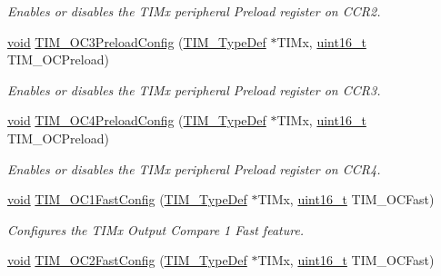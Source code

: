 \begin{DoxyCompactItemize}
\begin{DoxyCompactList}\small\item\em Enables or disables the T\+I\+Mx peripheral Preload register on C\+C\+R2. \end{DoxyCompactList}\item 
\hyperlink{usb__devapi_8h_afabf60e7f57651d6d595a02c75f07cd0}{void} \hyperlink{group___t_i_m___private___functions_ga8b2391685a519e60e596b7d596f86f09}{T\+I\+M\+\_\+\+O\+C3\+Preload\+Config} (\hyperlink{struct_t_i_m___type_def}{T\+I\+M\+\_\+\+Type\+Def} $\ast$T\+I\+Mx, \hyperlink{_p_e___types_8h_a1f1825b69244eb3ad2c7165ddc99c956}{uint16\+\_\+t} T\+I\+M\+\_\+\+O\+C\+Preload)
\begin{DoxyCompactList}\small\item\em Enables or disables the T\+I\+Mx peripheral Preload register on C\+C\+R3. \end{DoxyCompactList}\item 
\hyperlink{usb__devapi_8h_afabf60e7f57651d6d595a02c75f07cd0}{void} \hyperlink{group___t_i_m___private___functions_ga8bf4dfb35ff0c7b494dd96579f50b1ec}{T\+I\+M\+\_\+\+O\+C4\+Preload\+Config} (\hyperlink{struct_t_i_m___type_def}{T\+I\+M\+\_\+\+Type\+Def} $\ast$T\+I\+Mx, \hyperlink{_p_e___types_8h_a1f1825b69244eb3ad2c7165ddc99c956}{uint16\+\_\+t} T\+I\+M\+\_\+\+O\+C\+Preload)
\begin{DoxyCompactList}\small\item\em Enables or disables the T\+I\+Mx peripheral Preload register on C\+C\+R4. \end{DoxyCompactList}\item 
\hyperlink{usb__devapi_8h_afabf60e7f57651d6d595a02c75f07cd0}{void} \hyperlink{group___t_i_m___private___functions_gaec82031ca62f31f5483195c09752a83a}{T\+I\+M\+\_\+\+O\+C1\+Fast\+Config} (\hyperlink{struct_t_i_m___type_def}{T\+I\+M\+\_\+\+Type\+Def} $\ast$T\+I\+Mx, \hyperlink{_p_e___types_8h_a1f1825b69244eb3ad2c7165ddc99c956}{uint16\+\_\+t} T\+I\+M\+\_\+\+O\+C\+Fast)
\begin{DoxyCompactList}\small\item\em Configures the T\+I\+Mx Output Compare 1 Fast feature. \end{DoxyCompactList}\item 
\hyperlink{usb__devapi_8h_afabf60e7f57651d6d595a02c75f07cd0}{void} \hyperlink{group___t_i_m___private___functions_ga413359c87f46c69f1ffe2dc8fb3a65e7}{T\+I\+M\+\_\+\+O\+C2\+Fast\+Config} (\hyperlink{struct_t_i_m___type_def}{T\+I\+M\+\_\+\+Type\+Def} $\ast$T\+I\+Mx, \hyperlink{_p_e___types_8h_a1f1825b69244eb3ad2c7165ddc99c956}{uint16\+\_\+t} T\+I\+M\+\_\+\+O\+C\+Fast)

\end{DoxyCompactItemize}
